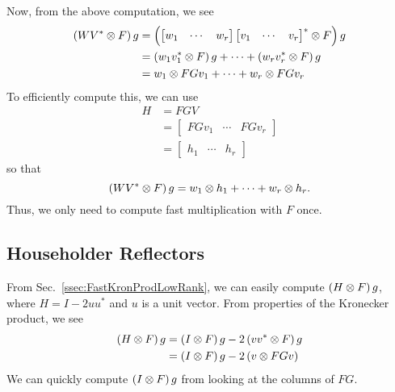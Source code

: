 Now, from the above computation, we see
%
\begin{align}
    \left( WV^{*}\otimes F \right)g
        &= \left( \begin{bmatrix} w_{1} & \cdots & w_{r} \end{bmatrix}
            \begin{bmatrix} v_{1} & \cdots & v_{r} \end{bmatrix}^{*}
            \otimes F \right)g \nonumber\\
        &= \left( w_{1}v_{1}^{*} \otimes F \right)g + \cdots +
            \left( w_{r}v_{r}^{*} \otimes F \right)g \nonumber\\
        &= w_{1}\otimes FGv_{1} + \cdots + w_{r}\otimes FGv_{r}
\end{align}
%
To efficiently compute this, we can use
%
\begin{align}
    H &= FGV \nonumber\\
        &= \begin{bmatrix} FGv_{1} & \cdots & FGv_{r} \end{bmatrix} \nonumber\\
        &= \begin{bmatrix} h_{1} & \cdots & h_{r} \end{bmatrix}
\end{align}
%
so that
%
\begin{equation}
    \left( WV^{*}\otimes F \right)g = w_{1}\otimes h_{1} +
        \cdots + w_{r}\otimes h_{r}.
\end{equation}
%
Thus, we only need to compute fast multiplication with $F$ once.



\subsection{Householder Reflectors}
\label{ssec:FastKronProdHouse}

From Sec.~\ref{ssec:FastKronProdLowRank}, we can easily
compute $\left( H\otimes F \right)g$, where $H = I - 2uu^{*}$ and
$u$ is a unit vector.
From properties of the Kronecker product, we see
%
\begin{align}
    \left( H\otimes F \right)g
        &= \left( I\otimes F \right)g - 2\left( vv^{*}\otimes F \right)g \nonumber\\
        &= \left( I\otimes F \right)g - 2\left( v\otimes FGv \right)
\end{align}
%
We can quickly compute $\left( I\otimes F \right)g$ from looking at the
columns of $FG$.



